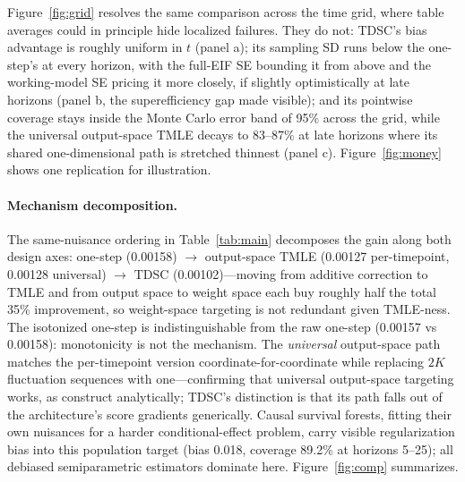 \documentclass[11pt]{article}
\theoremstyle{remark}
\begin{document}
Figure~\ref{fig:grid} resolves the same comparison across the time grid, where table averages could in principle hide localized failures. They do not: TDSC's bias advantage is roughly uniform in $t$ (panel a); its sampling SD runs below the one-step's at every horizon, with the full-EIF SE bounding it from above and the working-model SE pricing it more closely, if slightly optimistically at late horizons (panel b, the superefficiency gap made visible); and its pointwise coverage stays inside the Monte Carlo error band of 95\% across the grid, while the universal output-space TMLE decays to 83--87\% at late horizons where its shared one-dimensional path is stretched thinnest (panel c). Figure~\ref{fig:money} shows one replication for illustration.

\paragraph{Mechanism decomposition.} The same-nuisance ordering in Table~\ref{tab:main} decomposes the gain along both design axes: one-step (0.00158) $\to$ output-space TMLE (0.00127 per-timepoint, 0.00128 universal) $\to$ TDSC (0.00102)---moving from additive correction to TMLE and from output space to weight space each buy roughly half the total 35\% improvement, so weight-space targeting is not redundant given TMLE-ness. The isotonized one-step is indistinguishable from the raw one-step (0.00157 vs 0.00158): monotonicity is not the mechanism. The \emph{universal} output-space path matches the per-timepoint version coordinate-for-coordinate while replacing $2K$ fluctuation sequences with one---confirming that universal output-space targeting works, as \citet{cai2020,rytgaard2024} construct analytically; TDSC's distinction is that its path falls out of the architecture's score gradients generically. Causal survival forests, fitting their own nuisances for a harder conditional-effect problem, carry visible regularization bias into this population target (bias 0.018, coverage 89.2\% at horizons 5--25); all debiased semiparametric estimators dominate here. Figure~\ref{fig:comp} summarizes.
\end{document}
